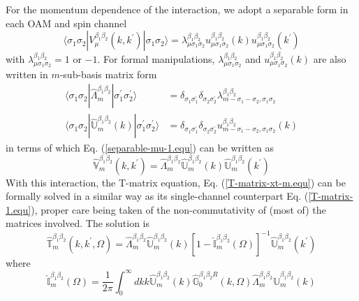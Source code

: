 \documentclass[aps,prb,superscriptaddress,letterpaper,amsmath,amssymb,twocolumn,preprintnumbers]{revtex4}
\begin{document}
For the momentum dependence of the interaction, we adopt a separable form in each OAM and spin channel
\begin{equation}\label{separable-mu-1.equ}
\langle \sigma_1 \sigma_2 | V^{\beta_1 \beta_2}_{\mu} (k , k^{\prime}) | \sigma_1 \sigma_2 \rangle
= \lambda^{\beta_1 \beta_2}_{\mu \sigma_1 \sigma_2} u^{\beta_1 \beta_2}_{\mu \sigma_1 \sigma_2}(k) u^{\beta_1 \beta_2}_{\mu \sigma_1 \sigma_2}(k^{\prime})
\end{equation}
with $\lambda^{\beta_1 \beta_2}_{\mu \sigma_1 \sigma_2} = 1$ or $-1$. For formal manipulations, $\lambda^{\beta_1 \beta_2}_{\mu \sigma_1 \sigma_2}$ and $u^{\beta_1 \beta_2}_{\mu \sigma_1 \sigma_2}(k)$ are also written in $m$-sub-basis matrix form
\begin{align}\label{lambda-m.equ}
\langle \sigma_1 \sigma_2 | \hat{\Lambda}^{\beta_1 \beta_2}_{m} | \sigma^{\prime}_1 \sigma^{\prime}_2 \rangle &= \delta_{\sigma_1 \sigma^{\prime}_1} \delta_{\sigma_2 \sigma^{\prime}_2} \lambda^{\beta_1 \beta_2}_{m - \sigma_1 - \sigma_2 , \sigma_1 \sigma_2} \\
\label{u-m.equ} \langle \sigma_1 \sigma_2 | \hat{\mathbb{U}}^{\beta_1 \beta_2}_{m} ( k ) | \sigma^{\prime}_1 \sigma^{\prime}_2 \rangle &=
\delta_{\sigma_1 \sigma^{\prime}_1} \delta_{\sigma_2 \sigma^{\prime}_2}
u^{\beta_1 \beta_2}_{m - \sigma_1 - \sigma_2 , \sigma_1 \sigma_2} ( k )
\end{align}
in terms of which Eq. (\ref{separable-mu-1.equ}) can be written as
\begin{equation}\label{V-m-1.equ}
\hat{\mathbb{V}}^{\beta_1 \beta_2}_{m} (k,k^{\prime}) = \hat{\Lambda}^{\beta_1 \beta_2}_{m} \hat{\mathbb{U}}^{\beta_1 \beta_2}_{m} ( k ) \hat{\mathbb{U}}^{\beta_1 \beta_2}_{m} ( k^{\prime} )
\end{equation}
With this interaction, the T-matrix equation, Eq. (\ref{T-matrix-xt-m.equ}) can be formally solved in a similar way as its single-channel counterpart Eq. (\ref{T-matrix-1.equ}), proper care being taken of the non-commutativity of (most of) the matrices involved. The solution is
\begin{equation}\label{T-matrix-xt-soln.equ}
\hat{\mathbb{T}}^{\beta_1 \beta_2}_{m} ( k,k^{\prime}, \Omega) = \hat{\Lambda}^{\beta_1 \beta_2}_{m} \hat{\mathbb{U}}^{\beta_1 \beta_2}_{m} ( k ) \left[ 1 - \hat{\mathbb{I}}^{\beta_1 \beta_2}_{m} (\Omega) \right]^{-1} \hat{\mathbb{U}}^{\beta_1 \beta_2}_{m} ( k^{\prime} )
\end{equation}
where
\begin{equation}\label{I-xt-m.equ}
\hat{\mathbb{I}}^{\beta_1 \beta_2}_{m} (\Omega) = \frac {1} {2 \pi} \int^{\infty}_{0} d k k \hat{\mathbb{U}}^{\beta_1 \beta_2}_{m} ( k ) \hat{\mathbb{G}}^{\beta_1 \beta_2 R}_{0} (k,\Omega) \hat{\Lambda}^{\beta_1 \beta_2}_{m} \hat{\mathbb{U}}^{\beta_1 \beta_2}_{m} ( k )
\end{equation}
\end{document}
